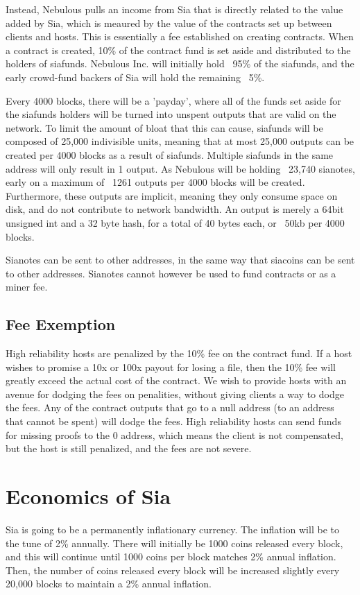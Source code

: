 \documentclass[twocolumn]{article}
\begin{document}
Instead, Nebulous pulls an income from Sia that is directly related to the value added by Sia, which is meaured by the value of the contracts set up between clients and hosts.
This is essentially a fee established on creating contracts.
When a contract is created, 10\% of the contract fund is set aside and distributed to the holders of siafunds.
Nebulous Inc. will initially hold ~95\% of the siafunds, and the early crowd-fund backers of Sia will hold the remaining ~5\%.

Every 4000 blocks, there will be a 'payday', where all of the funds set aside for the siafunds holders will be turned into unspent outputs that are valid on the network.
To limit the amount of bloat that this can cause, siafunds will be composed of 25,000 indivisible units, meaning that at most 25,000 outputs can be created per 4000 blocks as a result of siafunds.
Multiple siafunds in the same address will only result in 1 output.
As Nebulous will be holding ~23,740 sianotes, early on a maximum of ~1261 outputs per 4000 blocks will be created.
Furthermore, these outputs are implicit, meaning they only consume space on disk, and do not contribute to network bandwidth.
An output is merely a 64bit unsigned int and a 32 byte hash, for a total of 40 bytes each, or ~50kb per 4000 blocks.

Sianotes can be sent to other addresses, in the same way that siacoins can be sent to other addresses.
Sianotes cannot however be used to fund contracts or as a miner fee.

\subsection{Fee Exemption}
High reliability hosts are penalized by the 10\% fee on the contract fund.
If a host wishes to promise a 10x or 100x payout for losing a file, then the 10\% fee will greatly exceed the actual cost of the contract.
We wish to provide hosts with an avenue for dodging the fees on penalities, without giving clients a way to dodge the fees.
Any of the contract outputs that go to a null address (to an address that cannot be spent) will dodge the fees.
High reliability hosts can send funds for missing proofs to the 0 address, which means the client is not compensated, but the host is still penalized, and the fees are not severe.

\section{Economics of Sia}
Sia is going to be a permanently inflationary currency.
The inflation will be to the tune of 2\% annually.
There will initially be 1000 coins released every block, and this will continue until 1000 coins per block matches 2\% annual inflation.
Then, the number of coins released every block will be increased slightly every 20,000 blocks to maintain a 2\% annual inflation.
\end{document}
